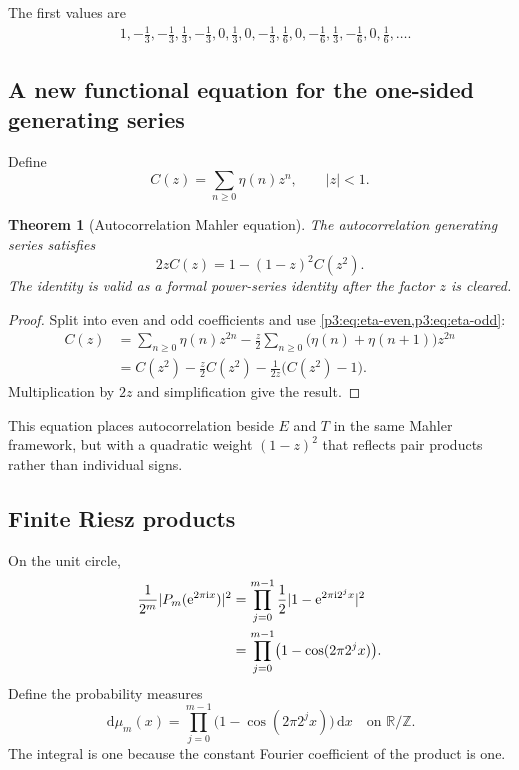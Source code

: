 \documentclass[11pt,oneside]{article}
\newtheorem{theorem}{Theorem}[section]
\theoremstyle{definition}
\theoremstyle{remark}
\newcommand{\R}{\mathbb R}
\newcommand{\Z}{\mathbb Z}
\newcommand{\e}{\mathrm e}
\newcommand{\ii}{\mathrm i}
\newcommand{\dd}{\,\mathrm d}
\begin{document}
The first values are
\begin{align*}
 &1,-\tfrac13,-\tfrac13,\tfrac13,-\tfrac13,0,\tfrac13,0,
 -\tfrac13,\tfrac16,0,-\tfrac16,\tfrac13,-\tfrac16,0,\tfrac16,\ldots.
\end{align*}

\subsection{A new functional equation for the one-sided generating series}

Define
\begin{equation}\label{p3:eq:C-definition}
 C(z)=\sum_{n\ge0}\eta(n)z^n,
 \qquad |z|<1.
\end{equation}

\begin{theorem}[Autocorrelation Mahler equation]\label{p3:thm:C-functional}
The autocorrelation generating series satisfies
\begin{equation}\label{p3:eq:C-functional}
 \boxed{\qquad
 2zC(z)=1-(1-z)^2C(z^2).
 \qquad}
\end{equation}
The identity is valid as a formal power-series identity after the factor $z$
is cleared.
\end{theorem}

\begin{proof}
Split into even and odd coefficients and use
\cref{p3:eq:eta-even,p3:eq:eta-odd}:
\begin{align*}
 C(z)
 &=\sum_{n\ge0}\eta(n)z^{2n}
 -\frac z2\sum_{n\ge0}\bigl(\eta(n)+\eta(n+1)\bigr)z^{2n}\\
 &=C(z^2)-\frac z2C(z^2)
   -\frac1{2z}\bigl(C(z^2)-1\bigr).
\end{align*}
Multiplication by $2z$ and simplification give the result.
\end{proof}

This equation places autocorrelation beside $E$ and $T$ in the same Mahler
framework, but with a quadratic weight $(1-z)^2$ that reflects pair products
rather than individual signs.

\subsection{Finite Riesz products}

On the unit circle,
\begin{align}
 \frac1{2^m}|P_m(\e^{2\pi\ii x})|^2
 &=\prod_{j=0}^{m-1}\frac12
   |1-\e^{2\pi\ii2^jx}|^2\notag\\
 &=\prod_{j=0}^{m-1}
   \bigl(1-\cos(2\pi2^jx)\bigr).
 \label{p3:eq:Riesz-density}
\end{align}
Define the probability measures
\begin{equation}\label{p3:eq:Riesz-measures}
 \dd\mu_m(x)=
 \prod_{j=0}^{m-1}\bigl(1-\cos(2\pi2^jx)\bigr)\dd x
 \quad\text{on }\R/\Z.
\end{equation}
The integral is one because the constant Fourier coefficient of the product is
one.
\end{document}
